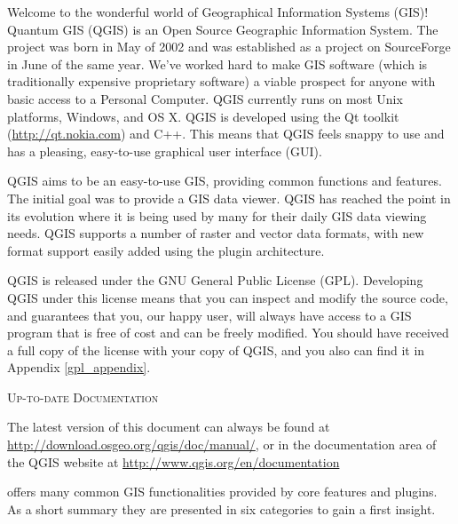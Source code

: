 \mainmatter
\pagestyle{scrheadings}
\label{label_forward}
\setcounter{page}{1}


Welcome to the wonderful world of Geographical Information Systems (GIS)!
Quantum GIS (QGIS) is an Open Source Geographic Information System. The project
was born in May of 2002 and was established as a project on SourceForge in June
of the same year. We've worked hard to make GIS software (which is traditionally
expensive proprietary software) a viable prospect for anyone with basic access
to a Personal Computer. QGIS currently runs on most Unix platforms, Windows, and
OS X. QGIS is developed using the Qt toolkit (\url{http://qt.nokia.com})
and C++. This means that QGIS feels snappy to use and has a pleasing, 
easy-to-use graphical user interface (GUI). 

QGIS aims to be an easy-to-use GIS, providing common functions and features.
The initial goal was to provide a GIS data viewer. QGIS has reached the point
in its evolution where it is being used by many for their daily GIS data viewing
needs. QGIS supports a number of raster and vector data formats, with new
format support easily added using the plugin architecture.

QGIS is released under the GNU General Public License (GPL). Developing QGIS 
under this license means that you can inspect and modify the source code,
and guarantees that you, our happy user, will always have access to a GIS
program that is free of cost and can be freely modified. You should have
received a full copy of the license with your copy of QGIS, and you also can
find it in Appendix \ref{gpl_appendix}.  

\begin{Tip}\caption{\textsc{Up-to-date Documentation}}
The latest version of this document can always be found at 
\url{http://download.osgeo.org/qgis/doc/manual/}, or in the documentation
area of the QGIS website at \url{http://www.qgis.org/en/documentation}
\end{Tip}

\label{label_majfeat}

\qg offers many common GIS functionalities provided by core features and
plugins. As a short summary they are presented in six categories to gain a
first insight.

